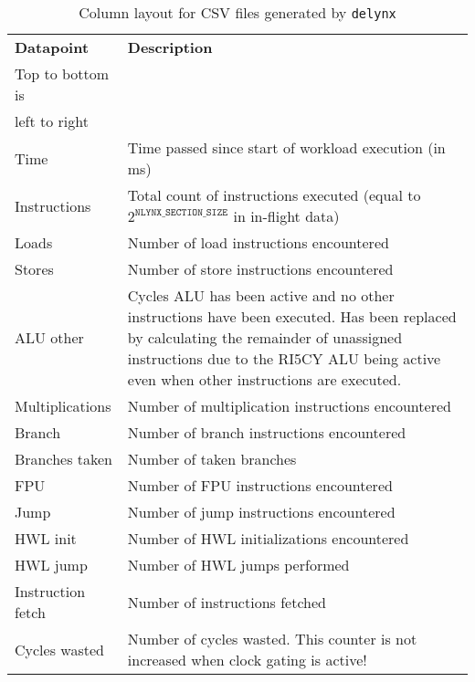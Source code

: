 \begin{table}
    \centering
    \begin{tabular}{lp{}}
        \textbf{Datapoint}  & \textbf{Description} \\
        Top to bottom is & \\
        left to right & \\
        \hline
        Time            & Time passed since start of workload execution (in ms) \\
        Instructions    & Total count of instructions executed (equal to $2^{\texttt{NLYNX\_SECTION\_SIZE}}$ in in-flight data) \\
        Loads           & Number of load instructions encountered \\
        Stores          & Number of store instructions encountered \\
        ALU other       & Cycles ALU has been active and no other instructions have been executed. Has been replaced by calculating the remainder of unassigned instructions due to the RI5CY ALU being active even when other instructions are executed. \\
        Multiplications & Number of multiplication instructions encountered \\
        Branch          & Number of branch instructions encountered \\
        Branches taken  & Number of taken branches \\
        FPU             & Number of FPU instructions encountered \\
        Jump            & Number of jump instructions encountered \\
        \ac{HWL} init   & Number of \ac{HWL} initializations encountered \\
        \ac{HWL} jump   & Number of \ac{HWL} jumps performed \\
        Instruction fetch   & Number of instructions fetched \\
        Cycles wasted   & Number of cycles wasted. This counter is not increased when clock gating is active! \\
    \end{tabular}
    \caption{Column layout for CSV files generated by \texttt{delynx}}
    \label{tab:howto/datalayout}
\end{table}